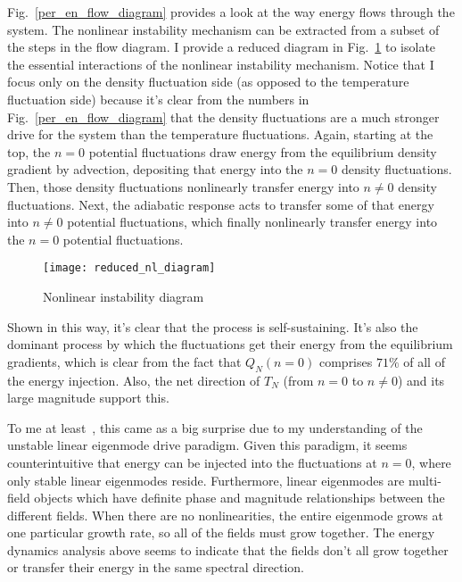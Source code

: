 Fig.~\ref{per_en_flow_diagram} provides a look at the way energy flows through the system. The nonlinear instability mechanism can be extracted from a subset of the steps in the flow diagram.
I provide a reduced diagram in Fig.~\ref{reduced_nl_diagram} to isolate the essential interactions of the nonlinear instability mechanism. Notice that I focus only on the density fluctuation
side (as opposed to the temperature fluctuation side) because it's clear from the numbers in Fig.~\ref{per_en_flow_diagram} that the density fluctuations are a much stronger drive for
the system than the temperature fluctuations. Again, starting at the top, the $n=0$ potential fluctuations draw energy from the equilibrium density gradient by advection, depositing that
energy into the $n=0$ density fluctuations. Then, those density fluctuations nonlinearly transfer energy into $n \ne 0$ density fluctuations. Next, the adiabatic response acts to transfer
some of that energy into $n \ne 0$ potential fluctuations, which finally nonlinearly transfer energy into the $n=0$ potential fluctuations.

\begin{figure}[!ht]
\centerline{\texttt{[image: reduced\_nl\_diagram]}}
\caption{Nonlinear instability diagram}
\label{reduced_nl_diagram}
\end{figure}

Shown in this way, it's clear that the process is self-sustaining. It's also the dominant process by which the fluctuations get their energy from the equilibrium gradients, which is clear
from the fact that $Q_N(n=0)$ comprises $71 \%$ of all of the energy injection. Also, the net direction of $T_N$ (from $n=0$ to $n \ne 0$) and its large magnitude support this.
 
To me at least~\cite{Umansky2011}, this came as a big surprise due to my understanding of the unstable linear eigenmode drive paradigm.
Given this paradigm, it seems counterintuitive that energy can be injected into the fluctuations at $n=0$, where only
stable linear eigenmodes reside. Furthermore, linear eigenmodes are multi-field objects which have definite phase and magnitude relationships between the different fields. When there are no
nonlinearities, the entire eigenmode grows at one particular growth rate, so all of the fields must grow together. The energy dynamics analysis above seems to indicate that the fields
don't all grow together or transfer their energy in the same spectral direction.

